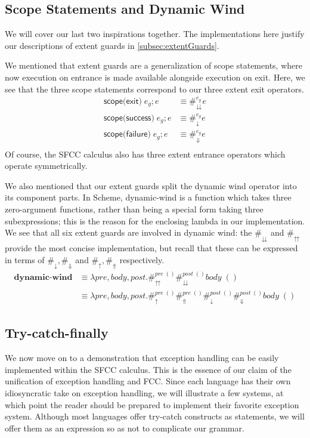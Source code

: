 \documentclass[11pt]{article}
\newcommand{\maybePage}{\newpage}
\begin{document}
\maybePage
\subsection{Scope Statements and Dynamic Wind}

We will cover our last two inspirations together.
The implementations here justify our descriptions of extent guards in \ref{subsec:extentGuards}.

We mentioned that extent guards are a generalization of scope statements, where now execution on entrance is made available alongside execution on exit.
Here, we see that the three scope statements correspond to our three extent exit operators.
\begin{align*}
\textsf{scope(exit)}\;e_g; e &\equiv \#_\downdownarrows^{e_g}e \\
\textsf{scope(success)}\;e_g; e &\equiv \#_\downarrow^{e_g}e \\
\textsf{scope(failure)}\;e_g; e &\equiv \#_\Downarrow^{e_g}e \\
\end{align*}
Of course, the SFCC calculus also has three extent entrance operators which operate symmetrically.

We also mentioned that our extent guards split the dynamic wind operator into its component parts.
In Scheme, dynamic-wind is a function which takes three zero-argument functions, rather than being a special form taking three subexpressions; this is the reason for the enclosing lambda in our implementation.
We see that all six extent guards are involved in dynamic wind:
the $\#_\downdownarrows$ and $\#_\upuparrows$ provide the most concise implementation, but recall that these can be expressed in terms of $\#_\downarrow, \#_\Downarrow$ and $\#_\uparrow, \#_\Uparrow$ respectively.
\begin{align*}
\textbf{dynamic-wind} &\equiv \lambda pre,body,post.
    \#_\upuparrows^{pre\;()}\#_\downdownarrows^{post\;()}body\;() \\
  &\equiv \lambda pre,body,post.
    \#_\uparrow^{pre\;()}\#_\Uparrow^{pre\;()}
    \#_\downarrow^{post\;()}\#_\Downarrow^{post\;()}
    body\;()
\end{align*}


\maybePage
\subsection{Try-catch-finally}
\label{subsec:implExn}

We now move on to a demonstration that exception handling can be easily implemented within the SFCC calculus.
This is the essence of our claim of the unification of exception handling and FCC.
Since each language has their own idiosyncratic take on exception handling, we will illustrate a few systems, at which point the reader should be prepared to implement their favorite exception system.
Although most languages offer try-catch constructs as statements, we will offer them as an expression so as not to complicate our grammar.
\end{document}
